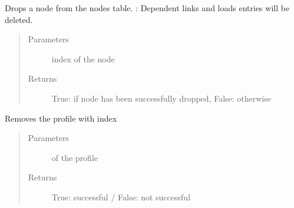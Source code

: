\documentclass[letterpaper,10pt,english]{sphinxmanual}
\begin{document}
\begin{fulllineitems}
\begin{fulllineitems}
\begin{quote}
\begin{description}
\end{description}\end{quote}

\end{fulllineitems}


\begin{fulllineitems}
\label{\detokenize{api:beamon.database.database.Database.remove_node}}
Drops a node from the nodes table.
: Dependent links and loads entries will be deleted.
\begin{quote}\begin{description}
\item[{Parameters}] \leavevmode
{} \textendash{} index of the node

\item[{Returns}] \leavevmode
True: if node has been successfully dropped, False: otherwise

\end{description}\end{quote}

\end{fulllineitems}


\begin{fulllineitems}
\label{\detokenize{api:beamon.database.database.Database.remove_profile}}
Removes the profile with index
\begin{quote}\begin{description}
\item[{Parameters}] \leavevmode
{} \textendash{} of the profile

\item[{Returns}] \leavevmode
True: successful / False: not successful


\end{description}
\end{quote}
\end{fulllineitems}
\end{fulllineitems}
\end{document}
